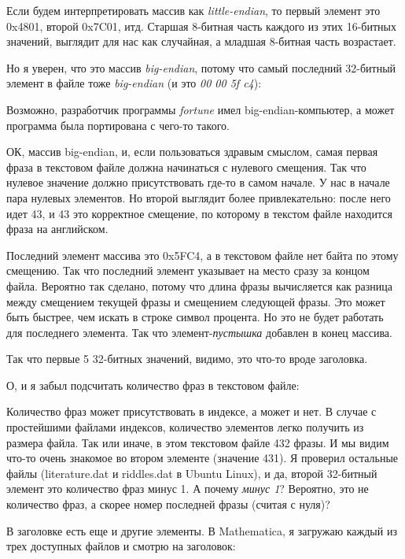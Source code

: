 

Если будем интерпретировать массив как \emph{little-endian}, то первый элемент это 0x4801, второй 0x7C01, итд.
Старшая 8-битная часть каждого из этих 16-битных значений, выглядит для нас как случайная, а младшая 8-битная часть
возрастает.

Но я уверен, что это массив \emph{big-endian}, потому что самый последний 32-битный элемент в файле
тоже \emph{big-endian} (и это \emph{00 00 5f c4}):



Возможно, разработчик программы \emph{fortune} имел big-endian-компьютер, а может программа была портирована с чего-то такого.

ОК, массив big-endian, и, если пользоваться здравым смыслом, самая первая фраза в текстовом файле должна начинаться с нулевого
смещения.
Так что нулевое значение должно присутствовать где-то в самом начале.
У нас в начале пара нулевых элементов. Но второй выглядит более привлекательно: после него идет 43, и 43 это корректное
смещение, по которому в текстом файле находится фраза на английском.

Последний элемент массива это 0x5FC4, а в текстовом файле нет байта по этому смещению.
Так что последний элемент указывает на место сразу за концом файла.
Вероятно так сделано, потому что длина фразы вычисляется как разница между смещением текущей фразы
и смещением следующей фразы.
Это может быть быстрее, чем искать в строке символ процента. 
Но это не будет работать для последнего элемента.
Так что элемент-\emph{пустышка} добавлен в конец массива.

Так что первые 5 32-битных значений, видимо, это что-то вроде заголовка.

О, и я забыл подсчитать количество фраз в текстовом файле:



Количество фраз может присутствовать в индексе, а может и нет.
В случае с простейшими файлами индексов, количество элементов легко получить из размера файла.
Так или иначе, в этом текстовом файле 432 фразы.
И мы видим что-то очень знакомое во втором элементе (значение 431).
Я проверил остальные файлы (literature.dat и riddles.dat в Ubuntu Linux), и да, второй 32-битный элемент это
количество фраз минус 1.
А почему \emph{минус 1}? Вероятно, это не количество фраз, а скорее номер последней фразы (считая с нуля)?

В заголовке есть еще и другие элементы.
В Mathematica, я загружаю каждый из трех доступных файлов и смотрю на заголовок:

